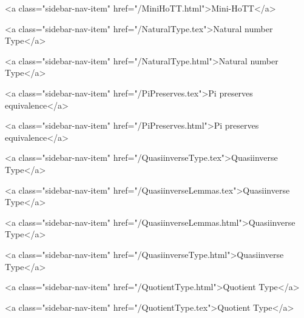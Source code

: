       
        
          <a class="sidebar-nav-item" href="/MiniHoTT.html">Mini-HoTT</a>
        
      
    
      
        
          <a class="sidebar-nav-item" href="/NaturalType.tex">Natural number Type</a>
        
      
    
      
        
          <a class="sidebar-nav-item" href="/NaturalType.html">Natural number Type</a>
        
      
    
      
        
          <a class="sidebar-nav-item" href="/PiPreserves.tex">Pi preserves equivalence</a>
        
      
    
      
        
          <a class="sidebar-nav-item" href="/PiPreserves.html">Pi preserves equivalence</a>
        
      
    
      
        
          <a class="sidebar-nav-item" href="/QuasiinverseType.tex">Quasiinverse Type</a>
        
      
    
      
        
          <a class="sidebar-nav-item" href="/QuasiinverseLemmas.tex">Quasiinverse Type</a>
        
      
    
      
        
          <a class="sidebar-nav-item" href="/QuasiinverseLemmas.html">Quasiinverse Type</a>
        
      
    
      
        
          <a class="sidebar-nav-item" href="/QuasiinverseType.html">Quasiinverse Type</a>
        
      
    
      
        
          <a class="sidebar-nav-item" href="/QuotientType.html">Quotient Type</a>
        
      
    
      
        
          <a class="sidebar-nav-item" href="/QuotientType.tex">Quotient Type</a>
        

